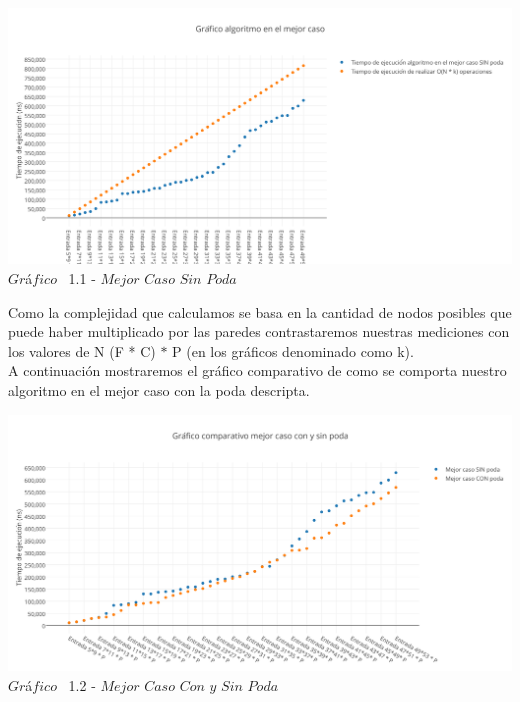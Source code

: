 \vspace*{0.3cm} \vspace*{0.3cm}
  \begin{center}
 \includegraphics[scale=0.65]{./EJ1/mejorcaso.png}
 {$Gr$\'a$fico$ \ 1.1 - $Mejor$ $Caso$ $Sin$ $Poda$}
  \end{center}
  \vspace*{0.3cm}

Como la complejidad que calculamos se basa en la cantidad de nodos posibles que puede haber multiplicado por las paredes contrastaremos nuestras mediciones con los valores de N (F * C) $\ast$ P (en los gr\'aficos denominado como k).\\
A continuaci\'on mostraremos el gr\'afico comparativo de como se comporta nuestro algoritmo en el mejor caso con la poda descripta.\\

\vspace*{0.3cm} \vspace*{0.3cm}
  \begin{center}
 \includegraphics[scale=0.65]{./EJ1/mejorcaso1.png}
 {$Gr$\'a$fico$ \ 1.2 - $Mejor$ $Caso$ $Con$ $y$ $Sin$ $Poda$}
  \end{center}
  \vspace*{0.3cm}


